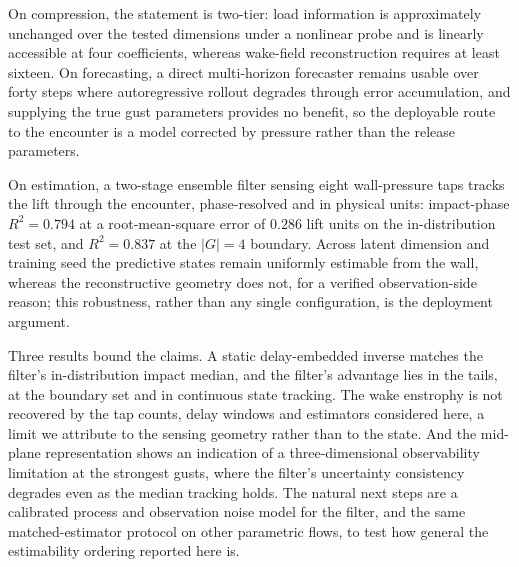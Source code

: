 On compression, the statement is two-tier: load information is
approximately unchanged over the tested dimensions under a nonlinear
probe and is linearly accessible at four coefficients, whereas
wake-field reconstruction requires at least sixteen. On forecasting, a
direct multi-horizon forecaster remains usable over forty steps where
autoregressive rollout degrades through error accumulation, and
supplying the true gust parameters provides no benefit, so the
deployable route to the encounter is a model corrected by pressure
rather than the release parameters.

On estimation, a two-stage ensemble filter sensing eight wall-pressure
taps tracks the lift through the encounter, phase-resolved and in
physical units: impact-phase $R^2 = 0.794$ at a root-mean-square error
of $0.286$ lift units on the in-distribution test set, and $R^2 = 0.837$
at the $|G| = 4$ boundary. %
Across latent dimension and training seed the predictive states remain
uniformly estimable from the wall, whereas the reconstructive geometry
does not, for a verified observation-side reason; this robustness,
rather than any single configuration, is the deployment argument.

Three results bound the claims. A static delay-embedded inverse matches
the filter's in-distribution impact median, and the filter's advantage
lies in the tails, at the boundary set and in continuous state tracking.
The wake enstrophy is not recovered by the tap counts, delay windows and
estimators considered here, a limit we attribute to the sensing geometry
rather than to the state. And the mid-plane representation shows an
indication of a three-dimensional observability limitation at the
strongest gusts, where the filter's uncertainty consistency degrades
even as the median tracking holds. The natural next steps are a
calibrated process and observation noise model for the filter, and the
same matched-estimator protocol on other parametric flows, to test how
general the estimability ordering reported here is.
